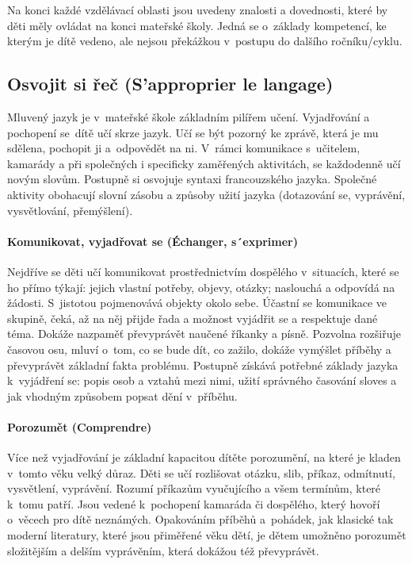 Na konci každé vzdělávací oblasti jsou uvedeny znalosti a dovednosti, které by děti měly ovládat na konci mateřské školy. Jedná se o~základy kompetencí, ke kterým je dítě vedeno, ale nejsou překážkou v~postupu do dalšího ročníku/cyklu.

		\subsection{Osvojit si řeč (S'approprier le langage)}
			Mluvený jazyk je v mateřské škole základním pilířem učení. Vyjadřování a pochopení se dítě učí skrze jazyk. Učí se být pozorný ke zprávě, která je mu sdělena, pochopit ji a odpovědět na ni. V rámci komunikace s učitelem, kamarády a při společných i specificky zaměřených aktivitách, se každodenně učí novým slovům. Postupně si osvojuje syntaxi francouzského jazyka. Společné aktivity obohacují slovní zásobu a způsoby užití jazyka (dotazování se, vyprávění, vysvětlování, přemýšlení).

			\paragraph{Komunikovat, vyjadřovat se (Échanger, s´exprimer)}

			Nejdříve se děti učí komunikovat prostřednictvím dospělého v situacích, které se ho přímo týkají: jejich vlastní potřeby, objevy, otázky; naslouchá a odpovídá na žádosti. S jistotou pojmenovává objekty okolo sebe. Účastní se komunikace ve skupině, čeká, až na něj přijde řada a možnost vyjádřit se a respektuje dané téma. Dokáže nazpaměť převyprávět naučené říkanky a písně. Pozvolna rozšiřuje časovou osu, mluví o~tom, co se bude dít, co zažilo, dokáže vymýšlet příběhy a převyprávět základní fakta problému. Postupně získává potřebné základy jazyka k vyjádření se: popis osob a vztahů mezi nimi, užití správného časování sloves a jak vhodným způsobem popsat dění v příběhu.

			\paragraph{Porozumět (Comprendre)}
			Více než vyjadřování je základní kapacitou dítěte porozumění, na které je kladen v tomto věku velký důraz.
			Děti se učí rozlišovat otázku, slib, příkaz, odmítnutí, vysvětlení, vyprávění. Rozumí příkazům vyučujícího a všem termínům, které k tomu patří. Jsou vedené k pochopení kamaráda či dospělého, který hovoří o~věcech pro dítě neznámých. Opakováním příběhů a pohádek, jak klasické tak moderní literatury, které jsou přiměřené věku dětí, je dětem umožněno porozumět složitějším a delším vyprávěním, která dokážou též převyprávět. 

